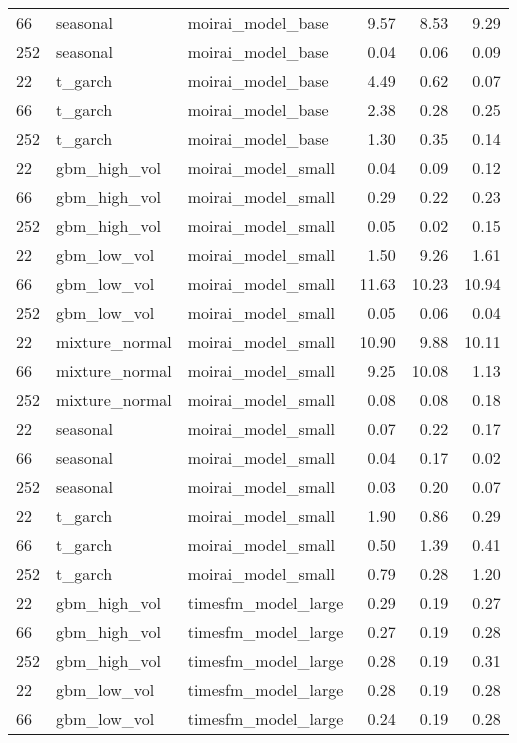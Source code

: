 {\begin{tabular}{lllrrr}
66 & seasonal & moirai\_model\_base & 9.57 & 8.53 & 9.29 \\
252 & seasonal & moirai\_model\_base & 0.04 & 0.06 & 0.09 \\
\midrule
22 & t\_garch & moirai\_model\_base & 4.49 & 0.62 & 0.07 \\
66 & t\_garch & moirai\_model\_base & 2.38 & 0.28 & 0.25 \\
252 & t\_garch & moirai\_model\_base & 1.30 & 0.35 & 0.14 \\
\midrule
22 & gbm\_high\_vol & moirai\_model\_small & 0.04 & 0.09 & 0.12 \\
66 & gbm\_high\_vol & moirai\_model\_small & 0.29 & 0.22 & 0.23 \\
252 & gbm\_high\_vol & moirai\_model\_small & 0.05 & 0.02 & 0.15 \\
\midrule
22 & gbm\_low\_vol & moirai\_model\_small & 1.50 & 9.26 & 1.61 \\
66 & gbm\_low\_vol & moirai\_model\_small & 11.63 & 10.23 & 10.94 \\
252 & gbm\_low\_vol & moirai\_model\_small & 0.05 & 0.06 & 0.04 \\
\midrule
22 & mixture\_normal & moirai\_model\_small & 10.90 & 9.88 & 10.11 \\
66 & mixture\_normal & moirai\_model\_small & 9.25 & 10.08 & 1.13 \\
252 & mixture\_normal & moirai\_model\_small & 0.08 & 0.08 & 0.18 \\
\midrule
22 & seasonal & moirai\_model\_small & 0.07 & 0.22 & 0.17 \\
66 & seasonal & moirai\_model\_small & 0.04 & 0.17 & 0.02 \\
252 & seasonal & moirai\_model\_small & 0.03 & 0.20 & 0.07 \\
\midrule
22 & t\_garch & moirai\_model\_small & 1.90 & 0.86 & 0.29 \\
66 & t\_garch & moirai\_model\_small & 0.50 & 1.39 & 0.41 \\
252 & t\_garch & moirai\_model\_small & 0.79 & 0.28 & 1.20 \\
\midrule
22 & gbm\_high\_vol & timesfm\_model\_large & 0.29 & 0.19 & 0.27 \\
66 & gbm\_high\_vol & timesfm\_model\_large & 0.27 & 0.19 & 0.28 \\
252 & gbm\_high\_vol & timesfm\_model\_large & 0.28 & 0.19 & 0.31 \\
\midrule
22 & gbm\_low\_vol & timesfm\_model\_large & 0.28 & 0.19 & 0.28 \\
66 & gbm\_low\_vol & timesfm\_model\_large & 0.24 & 0.19 & 0.28 \\

\end{tabular}}
